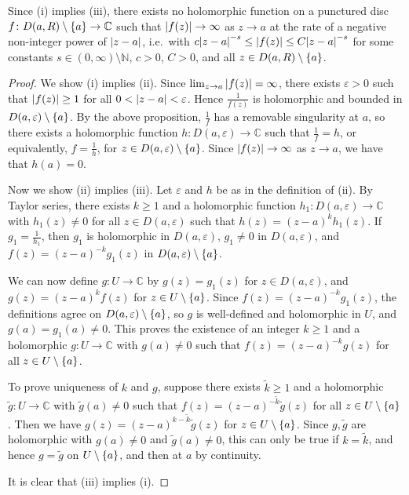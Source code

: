\begin{remark}
	Since (i) implies (iii), there exists no holomorphic function on a punctured disc \( f \colon D(a,R) \setminus \qty{a} \to \mathbb C \) such that \( \abs{f(z)} \to \infty \) as \( z \to a \) at the rate of a negative non-integer power of \( \abs{z-a} \), i.e.\ with \( c\abs{z-a}^{-s} \leq \abs{f(z)} \leq C\abs{z-a}^{-s} \) for some constants \( s \in (0,\infty) \setminus \mathbb N \), \( c > 0 \), \( C > 0 \), and all \( z \in D(a,R) \setminus \qty{a} \).
\end{remark}
\begin{proof}
	We show (i) implies (ii).
	Since \( \lim_{z \to a} \abs{f(z)} = \infty \), there exists \( \varepsilon > 0 \) such that \( \abs{f(z)} \geq 1 \) for all \( 0 < \abs{z-a} < \varepsilon \).
	Hence \( \frac{1}{f(z)} \) is holomorphic and bounded in \( D(a,\varepsilon) \setminus \qty{a} \).
	By the above proposition, \( \frac{1}{f} \) has a removable singularity at \( a \), so there exists a holomorphic function \( h \colon D(a,\varepsilon) \to \mathbb C \) such that \( \frac{1}{f} = h \), or equivalently, \( f = \frac{1}{h} \), for \( z \in D(a,\varepsilon) \setminus \qty{a} \).
	Since \( \abs{f(z)} \to \infty \) as \( z \to a \), we have that \( h(a) = 0 \).

	Now we show (ii) implies (iii).
	Let \( \varepsilon \) and \( h \) be as in the definition of (ii).
	By Taylor series, there exists \( k \geq 1 \) and a holomorphic function \( h_1 \colon D(a,\varepsilon) \to \mathbb C \) with \( h_1(z) \neq 0 \) for all \( z \in D(a,\varepsilon) \) such that \( h(z) = (z-a)^k h_1(z) \).
	If \( g_1 = \frac{1}{h_1} \), then \( g_1 \) is holomorphic in \( D(a,\varepsilon) \), \( g_1 \neq 0 \) in \( D(a,\varepsilon) \), and \( f(z) = (z-a)^{-k} g_1(z) \) in \( D(a,\varepsilon) \setminus \qty{a} \).

	We can now define \( g \colon U \to \mathbb C \) by \( g(z) = g_1(z) \) for \( z \in D(a,\varepsilon) \), and \( g(z) = (z-a)^k f(z) \) for \( z \in U \setminus \qty{a} \).
	Since \( f(z) = (z-a)^{-k} g_1(z) \), the definitions agree on \( D(a,\varepsilon) \setminus \qty{a} \), so \( g \) is well-defined and holomorphic in \( U \), and \( g(a) = g_1(a) \neq 0 \).
	This proves the existence of an integer \( k \geq 1 \) and a holomorphic \( g \colon U \to \mathbb C \) with \( g(a) \neq 0 \) such that \( f(z) = (z-a)^{-k} g(z) \) for all \( z \in U \setminus \qty{a} \).

	To prove uniqueness of \( k \) and \( g \), suppose there exists \( \widetilde k \geq 1 \) and a holomorphic \( \widetilde g \colon U \to \mathbb C \) with \( \widetilde g(a) \neq 0 \) such that \( f(z) = (z-a)^{-\widetilde k} \widetilde g(z) \) for all \( z \in U \setminus \qty{a} \).
	Then we have \( g(z) = (z-a)^{k - \widetilde k} \widetilde g(z) \) for \( z \in U \setminus \qty{a} \).
	Since \( g, \widetilde g \) are holomorphic with \( g(a) \neq 0 \) and \( \widetilde g(a) \neq 0 \), this can only be true if \( k = \widetilde k \), and hence \( g = \widetilde g \) on \( U \setminus \qty{a} \), and then at \( a \) by continuity.

	It is clear that (iii) implies (i).
\end{proof}
